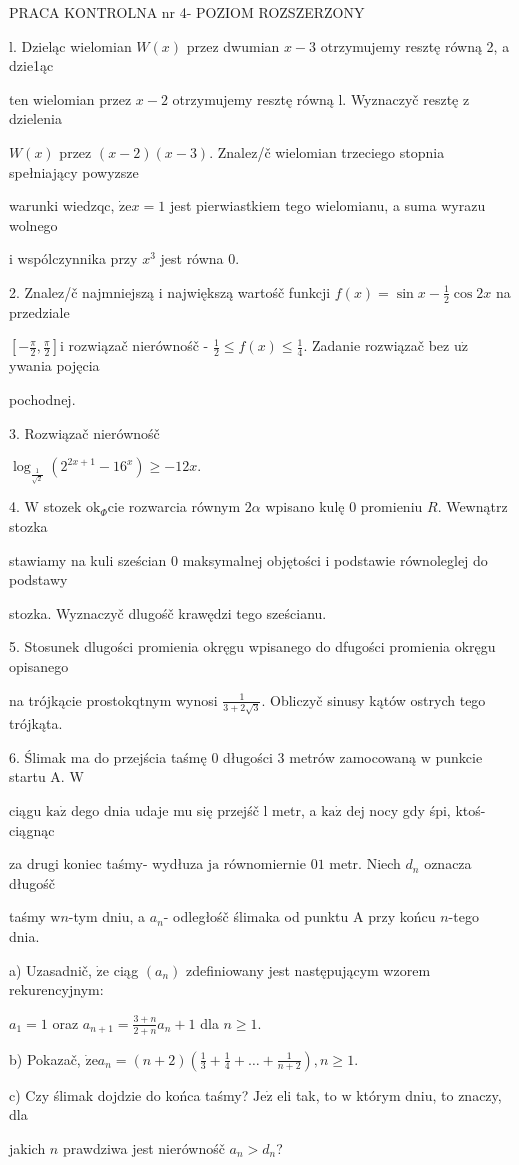 \documentclass[a4paper,12pt]{article}
\begin{document}
PRACA KONTROLNA nr 4- POZIOM ROZSZERZONY

l. Dzieląc wielomian $W(x)$ przez dwumian $x-3$ otrzymujemy resztę równą 2, a dzie1ąc

ten wielomian przez $x-2$ otrzymujemy resztę równą l. Wyznaczyč resztę $\mathrm{z}$ dzielenia

$W(x)$ przez $(x-2)(x-3)$. Znalez/č wielomian trzeciego stopnia spełniający powyzsze

warunki wiedzqc, $\dot{\mathrm{z}}\mathrm{e}x=1$ jest pierwiastkiem tego wielomianu, a suma wyrazu wolnego

$\mathrm{i}$ wspólczynnika przy $x^{3}$ jest równa 0.

2. Znalez/č najmniejszą $\mathrm{i}$ największą wartośč funkcji $f(x)=\displaystyle \sin x-\frac{1}{2}\cos 2x$ na przedziale

$[-\displaystyle \frac{\pi}{2},\frac{\pi}{2}] \mathrm{i}$ rozwiązač nierównośč - $\displaystyle \frac{1}{2}\leq f(x)\leq\frac{1}{4}$. Zadanie rozwiązač bez $\mathrm{u}\dot{\mathrm{z}}$ ywania pojęcia

pochodnej.

3. Rozwiązač nierównośč

$\log_{\frac{1}{\sqrt{2}}}(2^{2x+1}-16^{x})\geq-12x.$

4. $\mathrm{W}$ stozek $\mathrm{o}\mathrm{k}_{\Phi}\mathrm{c}\mathrm{i}\mathrm{e}$ rozwarcia równym $ 2\alpha$ wpisano kulę $0$ promieniu $R$. Wewnątrz stozka

stawiamy na kuli sześcian $0$ maksymalnej objętości $\mathrm{i}$ podstawie równoleglej do podstawy

stozka. Wyznaczyč dlugośč krawędzi tego sześcianu.

5. Stosunek dlugości promienia okręgu wpisanego do dfugości promienia okręgu opisanego

na trójkącie prostokqtnym wynosi $\displaystyle \frac{1}{3+2\sqrt{3}}$. Obliczyč sinusy kątów ostrych tego trójkąta.

6. Ślimak ma do przejścia taśmę $0$ długości 3 metrów zamocowaną $\mathrm{w}$ punkcie startu A. $\mathrm{W}$

ciągu $\mathrm{k}\mathrm{a}\dot{\mathrm{z}}$ dego dnia udaje mu się przejśč l metr, a $\mathrm{k}\mathrm{a}\dot{\mathrm{z}}$ dej nocy gdy śpi, ktoś- ciągnąc

za drugi koniec taśmy- wydłuza $\mathrm{j}\mathrm{a}$ równomiernie $0 1$ metr. Niech $d_{n}$ oznacza długośč

taśmy $\mathrm{w}n$-tym dniu, a $a_{n}$- odległośč ślimaka od punktu A przy końcu $n$-tego dnia.

a) Uzasadnič, $\dot{\mathrm{z}}\mathrm{e}$ ciąg $(a_{n})$ zdefiniowany jest następującym wzorem rekurencyjnym:

$a_{1}=1$ oraz $a_{n+1}=\displaystyle \frac{3+n}{2+n}a_{n}+1$ dla $n\geq 1.$

b) Pokazač, $\displaystyle \dot{\mathrm{z}}\mathrm{e}a_{n}=(n+2)(\frac{1}{3}+\frac{1}{4}+\ldots+\frac{1}{n+2}), n\geq 1.$

c) Czy ślimak dojdzie do końca taśmy? $\mathrm{J}\mathrm{e}\dot{\mathrm{z}}$ eli tak, to $\mathrm{w}$ którym dniu, to znaczy, dla

jakich $n$ prawdziwa jest nierównośč $a_{n}>d_{n}$?
\end{document}
